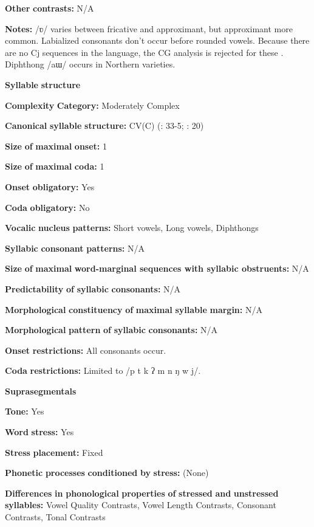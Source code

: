 \textbf{Other} \textbf{contrasts:} N/A

\textbf{Notes:} /ʋ/ varies between fricative and approximant, but approximant more common. Labialized consonants don’t occur before rounded vowels. Because there are no Cj sequences in the language, the CG analysis is rejected for these \citep[138]{Erickson2001}. Diphthong /aɯ/ occurs in Northern varieties.

\textbf{Syllable} \textbf{structure}

\textbf{Complexity} \textbf{Category:} Moderately Complex

\textbf{Canonical} \textbf{syllable} \textbf{structure:} CV(C) (\citealt{Enfield2007}: 33-5; \citealt{MorevEtAl1979}: 20)

\textbf{Size} \textbf{of} \textbf{maximal} \textbf{onset:} 1

\textbf{Size} \textbf{of} \textbf{maximal} \textbf{coda:} 1

\textbf{Onset} \textbf{obligatory:} Yes

\textbf{Coda} \textbf{obligatory:} No

\textbf{Vocalic} \textbf{nucleus} \textbf{patterns:} Short vowels, Long vowels, Diphthongs

\textbf{Syllabic} \textbf{consonant} \textbf{patterns:} N/A

\textbf{Size} \textbf{of} \textbf{maximal} \textbf{word{}-marginal sequences with syllabic obstruents:} N/A

\textbf{Predictability} \textbf{of} \textbf{syllabic} \textbf{consonants:} N/A

\textbf{Morphological} \textbf{constituency} \textbf{of} \textbf{maximal} \textbf{syllable} \textbf{margin:} N/A

\textbf{Morphological} \textbf{pattern} \textbf{of} \textbf{syllabic} \textbf{consonants:} N/A

\textbf{Onset} \textbf{restrictions:} All consonants occur. 

\textbf{Coda} \textbf{restrictions:} Limited to /p t k ʔ m n ŋ w j/.

\textbf{Suprasegmentals}

\textbf{Tone:} Yes

\textbf{Word} \textbf{stress:} Yes

\textbf{Stress} \textbf{placement:} Fixed

\textbf{Phonetic} \textbf{processes} \textbf{conditioned} \textbf{by} \textbf{stress:} (None)

\textbf{Differences} \textbf{in} \textbf{phonological} \textbf{properties} \textbf{of} \textbf{stressed} \textbf{and} \textbf{unstressed} \textbf{syllables:} Vowel Quality Contrasts, Vowel Length Contrasts, Consonant Contrasts, Tonal Contrasts

